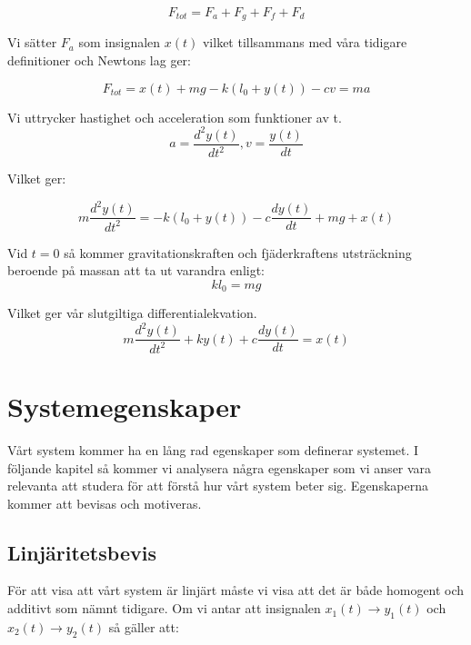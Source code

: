 \documentclass[10pt,a4paper]{article}
\begin{document}
\begin{equation}
F_{tot} = F_a + F_g + F_f + F_d
\end{equation}

Vi sätter $F_a$ som insignalen $x(t)$ vilket tillsammans med våra tidigare definitioner och Newtons lag ger:

\begin{equation}
F_{tot} = x(t) + mg - k(l_0+y(t)) - cv = ma
\end{equation}

Vi uttrycker hastighet och acceleration som funktioner av t.
\begin{equation}
a = \frac{d^2y(t)}{dt^2} , v = \frac{y(t)}{dt}
\end{equation}

Vilket ger:

\begin{equation}
 m\frac{d^2y(t)}{dt^2} =  -k(l_0 + y(t)) -c\frac{dy(t)}{dt} + mg +  x(t)
\end{equation}

Vid $t = 0$ så kommer gravitationskraften och fjäderkraftens utsträckning beroende på massan att ta ut varandra enligt:
\begin{equation}
k  l_0 = mg
\end{equation}

Vilket ger vår slutgiltiga differentialekvation.
\begin{equation}
 m\frac{d^2y(t)}{dt^2} + k  y(t) + c\frac{dy(t)}{dt} = x(t)
\end{equation}


\section{Systemegenskaper}

Vårt system kommer ha en lång rad egenskaper som definerar systemet. I följande kapitel så kommer vi analysera några egenskaper som vi anser vara relevanta att studera för att förstå hur vårt system beter sig. Egenskaperna kommer att bevisas och motiveras.

\subsection{Linjäritetsbevis}

För att visa att vårt system är linjärt måste vi visa att det är både homogent och additivt som nämnt tidigare. Om vi antar att insignalen $x_1(t) \rightarrow y_1(t)$ och $x_2(t) \rightarrow y_2(t)$ så gäller att:
\end{document}
